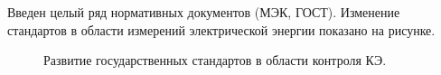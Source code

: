 Введен целый ряд нормативных документов (МЭК, ГОСТ). Изменение стандартов в области измерений электрической энергии показано на рисунке.
\cite{ГОСТ30804.4.30-2013, ГОСТ30804.4.7-2013, ГОСТ32144-2013, ГОСТР8.655-2009, ГОСТР51317.4.15-2012,ГОСТ33073-2014,ГОСТ8.622-2013} 
 
\begin{figure}[ht]
	\caption{Развитие государственных стандартов в области контроля КЭ.}\label{fig:picture1}
\end{figure}












